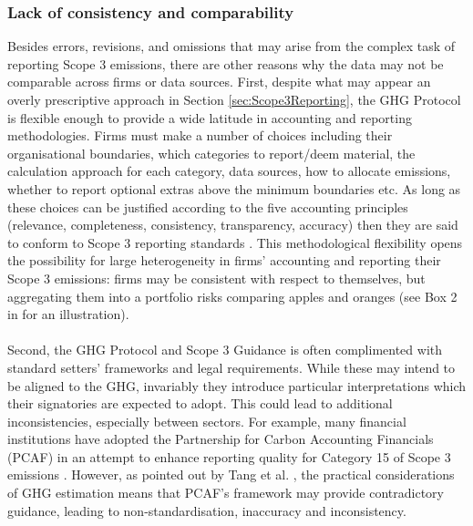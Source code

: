 \documentclass[12pt,twoside]{report}
\begin{document}
\subsubsection{Lack of consistency and comparability}
Besides errors, revisions, and omissions that may arise from the complex task of reporting Scope 3 emissions, there are other reasons why the data may not be comparable across firms or data sources. First, despite what may appear an overly prescriptive approach in Section \ref{sec:Scope3Reporting}, the GHG Protocol is flexible enough to provide a wide latitude in accounting and reporting methodologies. Firms must make a number of choices including their organisational boundaries, which categories to report/deem material, the calculation approach for each category, data sources, how to allocate emissions, whether to report optional extras above the minimum boundaries etc. As long as these choices can be justified according to the five accounting principles (relevance, completeness, consistency, transparency, accuracy) then they are said to conform to Scope 3 reporting standards \cite{ghgscope32013}. This methodological flexibility opens the possibility for large heterogeneity in firms' accounting and reporting their Scope 3 emissions: firms may be consistent with respect to themselves, but aggregating them into a portfolio risks comparing apples and oranges (see Box 2 in \cite{ftserussell2024} for an illustration). 
\\ \\
Second, the GHG Protocol and Scope 3 Guidance is often complimented with standard setters' frameworks and legal requirements. While these may intend to be aligned to the GHG, invariably they introduce particular interpretations which their signatories are expected to adopt. This could lead to additional inconsistencies, especially between sectors. For example, many financial institutions have adopted the Partnership for Carbon Accounting Financials (PCAF) in an attempt to enhance reporting quality for Category 15 of Scope 3 emissions \cite{PCAF2022}. However, as pointed out by Tang et al. \cite{Tang2023}, the practical considerations of GHG estimation means that PCAF's framework may provide contradictory guidance, leading to non-standardisation, inaccuracy and inconsistency. 
\\ \\
\end{document}
